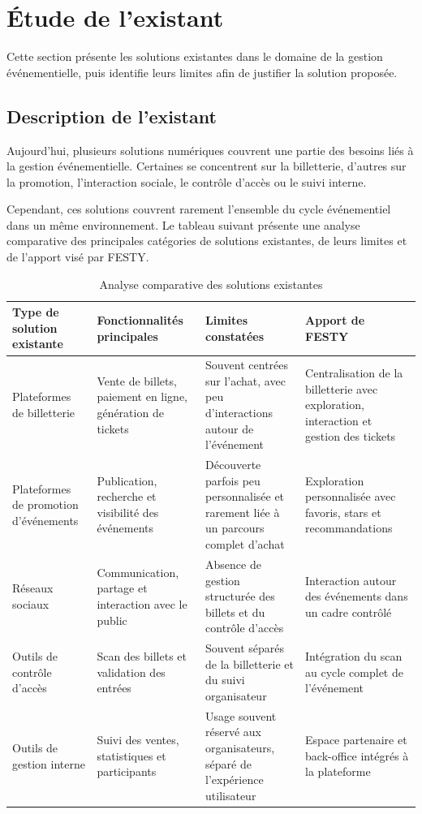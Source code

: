 \section{Étude de l’existant}


Cette section présente les solutions existantes dans le domaine de la gestion événementielle, puis identifie leurs limites afin de justifier la solution proposée.


\subsection{Description de l’existant}


Aujourd’hui, plusieurs solutions numériques couvrent une partie des besoins liés à la gestion événementielle. Certaines se concentrent sur la billetterie, d’autres sur la promotion, l’interaction sociale, le contrôle d’accès ou le suivi interne.


Cependant, ces solutions couvrent rarement l’ensemble du cycle événementiel dans un même environnement. Le tableau suivant présente une analyse comparative des principales catégories de solutions existantes, de leurs limites et de l’apport visé par FESTY.


\begin{table}[H]
\centering
\caption{Analyse comparative des solutions existantes}
\label{tableau:1-2}
\renewcommand{\arraystretch}{1.2}
\begin{tabularx}{\textwidth}{|>{\raggedright\arraybackslash}X|>{\raggedright\arraybackslash}X|>{\raggedright\arraybackslash}X|>{\raggedright\arraybackslash}X|}
\hline
\rowcolor[HTML]{ECF4FF}
\textbf{Type de solution existante} & \textbf{Fonctionnalités principales} & \textbf{Limites constatées} & \textbf{Apport de FESTY} \\
\hline
Plateformes de billetterie & Vente de billets, paiement en ligne, génération de tickets & Souvent centrées sur l’achat, avec peu d’interactions autour de l’événement & Centralisation de la billetterie avec exploration, interaction et gestion des tickets \\
\hline
Plateformes de promotion d’événements & Publication, recherche et visibilité des événements & Découverte parfois peu personnalisée et rarement liée à un parcours complet d’achat & Exploration personnalisée avec favoris, stars et recommandations \\
\hline
Réseaux sociaux & Communication, partage et interaction avec le public & Absence de gestion structurée des billets et du contrôle d’accès & Interaction autour des événements dans un cadre contrôlé \\
\hline
Outils de contrôle d’accès & Scan des billets et validation des entrées & Souvent séparés de la billetterie et du suivi organisateur & Intégration du scan au cycle complet de l’événement \\
\hline
Outils de gestion interne & Suivi des ventes, statistiques et participants & Usage souvent réservé aux organisateurs, séparé de l’expérience utilisateur & Espace partenaire et back-office intégrés à la plateforme \\
\hline
\end{tabularx}
\end{table}


